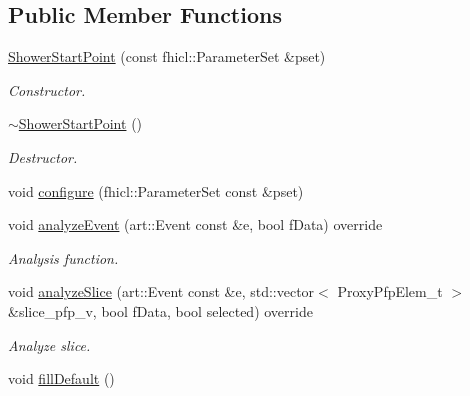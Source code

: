 \subsection*{Public Member Functions}
\begin{DoxyCompactItemize}
\item 
\hyperlink{classanalysis_1_1ShowerStartPoint_a8e100ffb3b55c24b61b176551f4585e9}{Shower\-Start\-Point} (const fhicl\-::\-Parameter\-Set \&pset)
\begin{DoxyCompactList}\small\item\em Constructor. \end{DoxyCompactList}\item 
\hypertarget{classanalysis_1_1ShowerStartPoint_a79dfe7401b305731582274fe09244da1}{\hyperlink{classanalysis_1_1ShowerStartPoint_a79dfe7401b305731582274fe09244da1}{$\sim$\-Shower\-Start\-Point} ()}\label{classanalysis_1_1ShowerStartPoint_a79dfe7401b305731582274fe09244da1}

\begin{DoxyCompactList}\small\item\em Destructor. \end{DoxyCompactList}\item 
void \hyperlink{classanalysis_1_1ShowerStartPoint_a9a170015fd21db2dbc150a507adafb2b}{configure} (fhicl\-::\-Parameter\-Set const \&pset)
\item 
void \hyperlink{classanalysis_1_1ShowerStartPoint_aa6b9c7e1d18ca6b68dfbbaa9cb6dfdbe}{analyze\-Event} (art\-::\-Event const \&e, bool f\-Data) override
\begin{DoxyCompactList}\small\item\em Analysis function. \end{DoxyCompactList}\item 
\hypertarget{classanalysis_1_1ShowerStartPoint_abefc8ff53cbb127bc0c25103e65324f2}{void \hyperlink{classanalysis_1_1ShowerStartPoint_abefc8ff53cbb127bc0c25103e65324f2}{analyze\-Slice} (art\-::\-Event const \&e, std\-::vector$<$ Proxy\-Pfp\-Elem\-\_\-t $>$ \&slice\-\_\-pfp\-\_\-v, bool f\-Data, bool selected) override}\label{classanalysis_1_1ShowerStartPoint_abefc8ff53cbb127bc0c25103e65324f2}

\begin{DoxyCompactList}\small\item\em Analyze slice. \end{DoxyCompactList}\item 
\hypertarget{classanalysis_1_1ShowerStartPoint_adf64ae771eb625703702728e91df9445}{void \hyperlink{classanalysis_1_1ShowerStartPoint_adf64ae771eb625703702728e91df9445}{fill\-Default} ()}\label{classanalysis_1_1ShowerStartPoint_adf64ae771eb625703702728e91df9445}


\end{DoxyCompactItemize}
